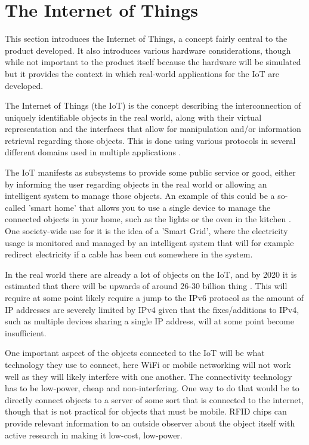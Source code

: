 \section{The Internet of Things}
This section introduces the Internet of Things, a concept fairly central to the product developed. It also introduces various hardware considerations, though while not important to the product itself because the hardware will be simulated but it provides the context in which real-world applications for the IoT are developed.

The Internet of Things (the IoT) is the concept describing the interconnection of uniquely identifiable objects in the real world, along with their virtual representation and the interfaces that allow for manipulation and/or information retrieval regarding those objects.
This is done using various protocols in several different domains used in multiple applications \citep{misc:InternetOfThingsDefinition} \citep{misc:InternetOfThingsDefinition2} \citep{misc:InternetOfThingsDefinition3}.

The IoT manifests as subsystems to provide some public service or good, either by informing the user regarding objects in the real world or allowing an intelligent system to manage those objects.
An example of this could be a so-called 'smart home' that allows you to use a single device to manage the connected objects in your home, such as the lights or the oven in the kitchen \citep{misc:InternetOfThingsExamples}.
One society-wide use for it is the idea of a 'Smart Grid', where the electricity usage is monitored and managed by an intelligent system that will for example redirect electricity if a cable has been cut somewhere in the system\citep{misc:smartGrid}.

In the real world there are already a lot of objects on the IoT, and by 2020 it is estimated that there will be upwards of around 26-30 billion thing \citep{misc:IoTGrowth1}\citep{misc:IoTGrowth2}.
This will require at some point likely require a jump to the IPv6 protocol as the amount of IP addresses are severely limited by IPv4\citep{misc:numberOfAddresses} given that the fixes/additions to IPv4, such as multiple devices sharing a single IP address, will at some point become insufficient.

One important aspect of the objects connected to the IoT will be what technology they use to connect, here WiFi or mobile networking will not work well as they will likely interfere with one another.
The connectivity technology has to be low-power, cheap and non-interfering.
One way to do that would be to directly connect objects to a server of some sort that is connected to the internet, though that is not practical for objects that must be mobile.
RFID chips can provide relevant information to an outside observer about the object itself\citep{misc:rfid} with active research in making it low-cost, low-power\citep{misc:rfid2}.

